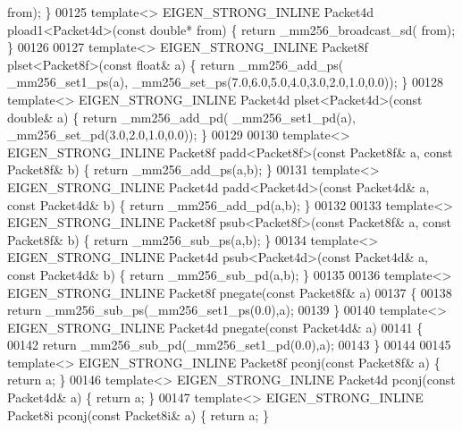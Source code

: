 \begin{DoxyCode}
      from); \}
00125 \textcolor{keyword}{template}<> EIGEN\_STRONG\_INLINE Packet4d pload1<Packet4d>(\textcolor{keyword}{const} \textcolor{keywordtype}{double}* from) \{ \textcolor{keywordflow}{return} \_mm256\_broadcast\_sd(
      from); \}
00126 
00127 \textcolor{keyword}{template}<> EIGEN\_STRONG\_INLINE Packet8f plset<Packet8f>(\textcolor{keyword}{const} \textcolor{keywordtype}{float}& a) \{ \textcolor{keywordflow}{return} \_mm256\_add\_ps(
      \_mm256\_set1\_ps(a), \_mm256\_set\_ps(7.0,6.0,5.0,4.0,3.0,2.0,1.0,0.0)); \}
00128 \textcolor{keyword}{template}<> EIGEN\_STRONG\_INLINE Packet4d plset<Packet4d>(\textcolor{keyword}{const} \textcolor{keywordtype}{double}& a) \{ \textcolor{keywordflow}{return} \_mm256\_add\_pd(
      \_mm256\_set1\_pd(a), \_mm256\_set\_pd(3.0,2.0,1.0,0.0)); \}
00129 
00130 \textcolor{keyword}{template}<> EIGEN\_STRONG\_INLINE Packet8f padd<Packet8f>(\textcolor{keyword}{const} Packet8f& a, \textcolor{keyword}{const} Packet8f& b) \{ \textcolor{keywordflow}{return} 
      \_mm256\_add\_ps(a,b); \}
00131 \textcolor{keyword}{template}<> EIGEN\_STRONG\_INLINE Packet4d padd<Packet4d>(\textcolor{keyword}{const} Packet4d& a, \textcolor{keyword}{const} Packet4d& b) \{ \textcolor{keywordflow}{return} 
      \_mm256\_add\_pd(a,b); \}
00132 
00133 \textcolor{keyword}{template}<> EIGEN\_STRONG\_INLINE Packet8f psub<Packet8f>(\textcolor{keyword}{const} Packet8f& a, \textcolor{keyword}{const} Packet8f& b) \{ \textcolor{keywordflow}{return} 
      \_mm256\_sub\_ps(a,b); \}
00134 \textcolor{keyword}{template}<> EIGEN\_STRONG\_INLINE Packet4d psub<Packet4d>(\textcolor{keyword}{const} Packet4d& a, \textcolor{keyword}{const} Packet4d& b) \{ \textcolor{keywordflow}{return} 
      \_mm256\_sub\_pd(a,b); \}
00135 
00136 \textcolor{keyword}{template}<> EIGEN\_STRONG\_INLINE Packet8f pnegate(\textcolor{keyword}{const} Packet8f& a)
00137 \{
00138   \textcolor{keywordflow}{return} \_mm256\_sub\_ps(\_mm256\_set1\_ps(0.0),a);
00139 \}
00140 \textcolor{keyword}{template}<> EIGEN\_STRONG\_INLINE Packet4d pnegate(\textcolor{keyword}{const} Packet4d& a)
00141 \{
00142   \textcolor{keywordflow}{return} \_mm256\_sub\_pd(\_mm256\_set1\_pd(0.0),a);
00143 \}
00144 
00145 \textcolor{keyword}{template}<> EIGEN\_STRONG\_INLINE Packet8f pconj(\textcolor{keyword}{const} Packet8f& a) \{ \textcolor{keywordflow}{return} a; \}
00146 \textcolor{keyword}{template}<> EIGEN\_STRONG\_INLINE Packet4d pconj(\textcolor{keyword}{const} Packet4d& a) \{ \textcolor{keywordflow}{return} a; \}
00147 \textcolor{keyword}{template}<> EIGEN\_STRONG\_INLINE Packet8i pconj(\textcolor{keyword}{const} Packet8i& a) \{ \textcolor{keywordflow}{return} a; \}

\end{DoxyCode}
